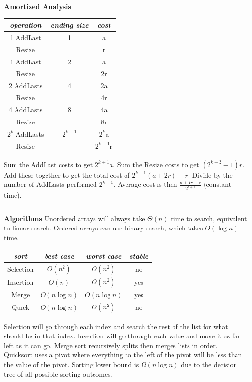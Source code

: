 \documentclass[9pt]{amsart}
\begin{document}
\begin{multicols*}{3}
  \columnbreak
  \textbf{Amortized Analysis}
  \footnotesize
  \begin{center}
  \begin{tabular}{c | c | c}
     \emph{operation} & \emph{ending size} & \emph{cost} \\
     \hline
     1 AddLast & 1 & a \\
     Resize & & r \\
     \hline
     1 AddLast & 2 & a \\
     Resize & & 2r \\
     \hline
     2 AddLasts & 4 & 2a \\
     Resize & & 4r \\
     \hline
     4 AddLasts & 8 & 4a \\
     Resize & & 8r \\
     \hline
     $2^k$ AddLasts & $2^{k+1}$ & $2^k$a \\
     Resize & & $2^{k+1}$r
  \end{tabular}
  \end{center}
  \normalsize
  Sum the AddLast costs to get $2^{k+1}a$. Sum the Resize costs to get $(2^{k+2}-1)r$.
  Add these together to get the total cost of $2^{k+1}(a+2r) - r$. Divide by the number 
  of AddLasts performed $2^{k+1}$. Average cost is then $\frac{a+2r - r}{2^{k+1}}$
  (constant time).

  \vskip 7pt
  \hrule
  \vskip 7pt

  \textbf{Algorithms}
  \newline
  Unordered arrays will always take $\Theta(n)$ time to search, equivalent to linear search.
  \newline
  Ordered arrays can use binary search, which takes $O(\log n)$ time.
  \footnotesize
  \begin{center}
  \begin{tabular}{c | c | c | c}
     \emph{sort} & \emph{best case} & \emph{worst case} & \emph{stable} \\
     \hline
     Selection & $O(n^2)$ & $O(n^2)$ & no \\
     \hline
     Insertion & $O(n)$ & $O(n^2)$ & yes \\
     \hline
     Merge & $O(n \log n)$ & $O(n \log n)$ & yes \\
     \hline
     Quick & $O(n \log n)$ & $O(n^2)$ & no \\
  \end{tabular}
  \end{center}
  \normalsize
  Selection will go through each index and search the rest of the list for what should be
  in that index. Insertion will go through each value and move it as far left as it can go.
  Merge sort recursively splits then merges lists in order. Quicksort uses a pivot where
  everything to the left of the pivot will be less than the value of the pivot.
  \vskip 5pt
  Sorting lower bound is $\Omega(n \log n)$ due to the decision tree of all possible sorting
  outcomes.


\end{multicols*}
\end{document}
